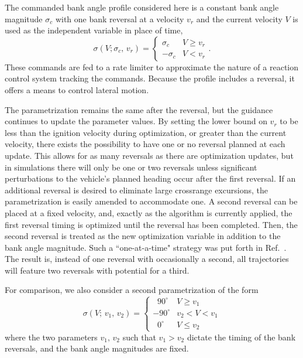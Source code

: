 \documentclass[letterpaper, paper,11pt]{AAS}
\begin{document}
The commanded bank angle profile considered here is a constant bank angle magnitude $\sigma_c$ with one bank reversal at a velocity $v_r$ and the current velocity $V$ is used as the independent variable in place of time,
\begin{equation}
\sigma(V; \sigma_c, \,v_r) = \left\{
\begin{array}{ll}
\sigma_c & V\geq v_r \\
-\sigma_c & V < v_r
\end{array} 
\right. .
\end{equation}
These commands are fed to a rate limiter to approximate the nature of a reaction control system tracking the commands. Because the profile includes a reversal, it offers a means to control lateral motion. 

The parametrization remains the same after the reversal, but the guidance continues to update the parameter values. By setting the lower bound on $v_r$ to be less than the ignition velocity during optimization, or greater than the current velocity, there exists the possibility to have one or no reversal planned at each update. This allows for as many reversals as there are optimization updates, but in simulations there will only be one or two reversals unless significant perturbations to the vehicle's planned heading occur after the first reversal. If an additional reversal is desired to eliminate large crossrange excursions, the parametrization is easily amended to accommodate one. A second reversal can be placed at a fixed velocity, and, exactly as the algorithm is currently applied, the first reversal timing is optimized until the reversal has been completed. Then, the second reversal is treated as the new optimization variable in addition to the bank angle magnitude. Such a ``one-at-a-time" strategy was put forth in Ref.~\cite{GuangfeiReplanning}. The result is, instead of one reversal with occasionally a second, all trajectories will feature two reversals with potential for a third. 

For comparison, we also consider a second parametrization of the form 
\begin{equation}
\sigma(V; \,v_1, \,v_2) = \left\{
\begin{array}{ll}
\;\;90^{\circ} & V\geq v_1 \\
-90^{\circ} & v_2 < V < v_1 \\
\;\;0^{\circ} & V \le v_2
\end{array} 
\right.
\end{equation}
where the two parameters $v_1,\, v_2$ such that $v_1 > v_2$ dictate the timing of the bank reversals, and the bank angle magnitudes are fixed.
\end{document}
